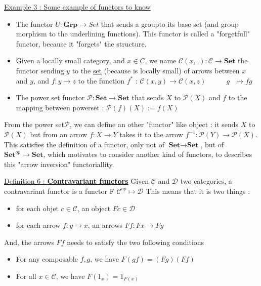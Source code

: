 \documentclass{article}
\begin{document}
{\noindent \large \underline{Example 3 : Some example of functors to know} \newline \normalsize \newline
\begin{itemize}[noitemsep]
\item The functor $U : \textbf{Grp} \rightarrow Set$ that sends a groupto its base set (and group morphism to the underlining functions). This functor is called a "forgetfull" functor, because it "forgets" the structure. \newline
\item Given  a locally small category, and $x \in C$, we name $\mathcal{C}(x, \_) : \mathcal{C} \rightarrow \textbf{Set}$ the functor sending $y$ to the \underline{set} (because  is locally small) of arrows between $x$ and $y$, and $f : y \rightarrow z$ to the function \newline
$f^{*}$ :  $\mathcal{C}(x, y) \rightarrow \mathcal{C}(x, z)$ \newline
$~~~~~~~~~~$ $g ~~~\longmapsto fg$ \newline


\item The power set functor $\mathcal{P} : \textbf{Set} \rightarrow \textbf{Set}$ that sends $X$ to $\mathcal{P}(X)$ and $f$
to the mapping between powerset : $\mathcal{P}(f)(X) := f(X)$ \newline 
\end{itemize} \newline 
\noindent From the power set$\mathcal{P}$,  we can define an other "functor" like object  : it sends $X$ to $\mathcal{P}(X)$ but from an arrow $f : X \rightarrow Y$ takes it to the arrow $f^{-1} : \mathcal{P}(Y) \rightarrow \mathcal{P}(X)$. This satisfies the definition of a functor, only not of $\textbf{Set} \rightarrow \textbf{Set}$, but of $\textbf{Set}^{op} \rightarrow \textbf{Set}$, which motivates to consider another kind of functors, to describes this "arrow inversion" functoriallity. \newline
 
\noindent \large \underline{Definition 6 : \textbf{Contravariant functors}} \newline \normalsize \newline
Given $\mathcal{C}$ and $\mathcal{D}$ two categories, a contravariant functor is a functor F $\mathcal{C}^{op} \mapsto \mathcal{D}$  \newline
This means that it is two things : 
\begin{itemize}[noitemsep]
\item for each objet $c \in \mathcal{C}$, an object $Fc \in \mathcal{D}$ 
\item for each arrow $f : y \rightarrow x$, an arrows $Ff : Fx \rightarrow Fy$  \end{itemize}
And, the arrows $Ff$ needs to satisfy the two following conditions
\begin{itemize}[noitemsep]
\item For any composable $f, g$, we have $F(gf) = (Fg) (Ff)$
\item For all $x \in \mathcal{C}$, we have $F(1_{x}) = 1_{F(x)}$
\end{itemize}


}
\end{document}
